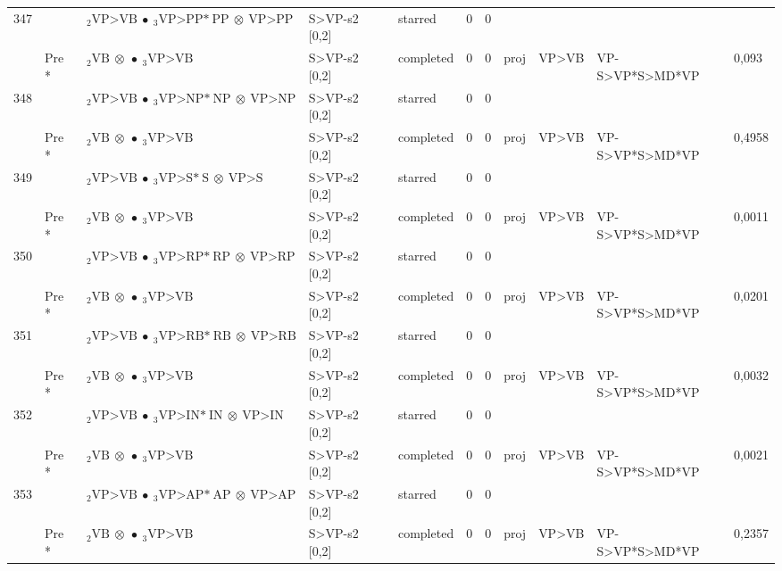 \documentclass[10pt]{article}
\begin{document}
\begin{longtable}[htbp]{lllllllllll}
347 & & $ {}_2 \textrm{VP>VB} \  \bullet \ {}_{3} \textrm{VP>PP*} \ \textrm{PP} \  \otimes \ \textrm{VP>PP} $ & S>VP-s2 [0,2] & starred & 0 & 0 & & & & \\ 
 & Pre *& $ {}_2 \textrm{VB} \  \otimes \  \bullet \ {}_{3} \textrm{VP>VB} $ & S>VP-s2 [0,2] & completed & 0 & 0 & proj & VP>VB & VP-S>VP*S>MD*VP & 0,093 \\ 
348 & & $ {}_2 \textrm{VP>VB} \  \bullet \ {}_{3} \textrm{VP>NP*} \ \textrm{NP} \  \otimes \ \textrm{VP>NP} $ & S>VP-s2 [0,2] & starred & 0 & 0 & & & & \\ 
 & Pre *& $ {}_2 \textrm{VB} \  \otimes \  \bullet \ {}_{3} \textrm{VP>VB} $ & S>VP-s2 [0,2] & completed & 0 & 0 & proj & VP>VB & VP-S>VP*S>MD*VP & 0,4958 \\ 
349 & & $ {}_2 \textrm{VP>VB} \  \bullet \ {}_{3} \textrm{VP>S*} \ \textrm{S} \  \otimes \ \textrm{VP>S} $ & S>VP-s2 [0,2] & starred & 0 & 0 & & & & \\ 
 & Pre *& $ {}_2 \textrm{VB} \  \otimes \  \bullet \ {}_{3} \textrm{VP>VB} $ & S>VP-s2 [0,2] & completed & 0 & 0 & proj & VP>VB & VP-S>VP*S>MD*VP & 0,0011 \\ 
350 & & $ {}_2 \textrm{VP>VB} \  \bullet \ {}_{3} \textrm{VP>RP*} \ \textrm{RP} \  \otimes \ \textrm{VP>RP} $ & S>VP-s2 [0,2] & starred & 0 & 0 & & & & \\ 
 & Pre *& $ {}_2 \textrm{VB} \  \otimes \  \bullet \ {}_{3} \textrm{VP>VB} $ & S>VP-s2 [0,2] & completed & 0 & 0 & proj & VP>VB & VP-S>VP*S>MD*VP & 0,0201 \\ 
351 & & $ {}_2 \textrm{VP>VB} \  \bullet \ {}_{3} \textrm{VP>RB*} \ \textrm{RB} \  \otimes \ \textrm{VP>RB} $ & S>VP-s2 [0,2] & starred & 0 & 0 & & & & \\ 
 & Pre *& $ {}_2 \textrm{VB} \  \otimes \  \bullet \ {}_{3} \textrm{VP>VB} $ & S>VP-s2 [0,2] & completed & 0 & 0 & proj & VP>VB & VP-S>VP*S>MD*VP & 0,0032 \\ 
352 & & $ {}_2 \textrm{VP>VB} \  \bullet \ {}_{3} \textrm{VP>IN*} \ \textrm{IN} \  \otimes \ \textrm{VP>IN} $ & S>VP-s2 [0,2] & starred & 0 & 0 & & & & \\ 
 & Pre *& $ {}_2 \textrm{VB} \  \otimes \  \bullet \ {}_{3} \textrm{VP>VB} $ & S>VP-s2 [0,2] & completed & 0 & 0 & proj & VP>VB & VP-S>VP*S>MD*VP & 0,0021 \\ 
353 & & $ {}_2 \textrm{VP>VB} \  \bullet \ {}_{3} \textrm{VP>AP*} \ \textrm{AP} \  \otimes \ \textrm{VP>AP} $ & S>VP-s2 [0,2] & starred & 0 & 0 & & & & \\ 
 & Pre *& $ {}_2 \textrm{VB} \  \otimes \  \bullet \ {}_{3} \textrm{VP>VB} $ & S>VP-s2 [0,2] & completed & 0 & 0 & proj & VP>VB & VP-S>VP*S>MD*VP & 0,2357 \\ 

\end{longtable}
\end{document}

